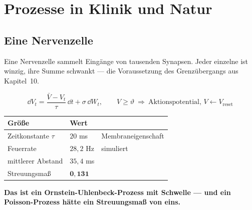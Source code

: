 \chapter{Prozesse in Klinik und Natur}

\section{Eine Nervenzelle}

\begin{merksatz}
Eine Nervenzelle sammelt Eingänge von tausenden Synapsen. Jeder einzelne ist winzig, ihre Summe schwankt --- die Voraussetzung des Grenzübergangs aus Kapitel~10.

\[ \dd V_t = \frac{\bar V - V_t}{\tau}\,\dd t + \sigma\,\dd W_t , \qquad V \ge \vartheta \ \Longrightarrow\ \text{Aktionspotential, } V \leftarrow V_{\text{reset}} \]

\begin{center}
{\small
\renewcommand{\arraystretch}{1.5}
\begin{tabular}{@{}P{2.8cm}P{2.0cm}P{3.0cm}@{}}
\toprule
\textbf{Größe} & \textbf{Wert} & \\
\midrule
Zeitkonstante $\tau$ & $20$ ms & Membran\-eigenschaft\\
Feuerrate & $28{,}2$ Hz & simuliert\\
mittlerer Abstand & $35{,}4$ ms & \\
Streuungsmaß & $\mathbf{0{,}131}$ & \\
\bottomrule
\end{tabular}}
\end{center}

\begin{center}
\begin{minipage}{0.9\textwidth}
\textbf{Das ist ein Ornstein-Uhlenbeck-Prozess mit Schwelle --- und ein Poisson-Prozess hätte ein Streuungsmaß von eins.}
\end{minipage}
\end{center}

\begin{center}
\begin{minipage}{0.88\textwidth}
\end{minipage}
\end{center}
\end{merksatz}

